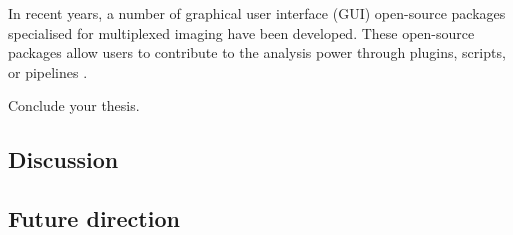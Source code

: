 In recent years, a number of graphical user interface (GUI) open-source packages specialised for multiplexed imaging have been developed. These open-source packages allow users to contribute to the analysis power through plugins, scripts, or pipelines \cite{bankhead2017qupath,schneider2012nih}.  
 
% 


Conclude your thesis.
\subsection{Discussion}
\subsection{Future direction}
% 

% 